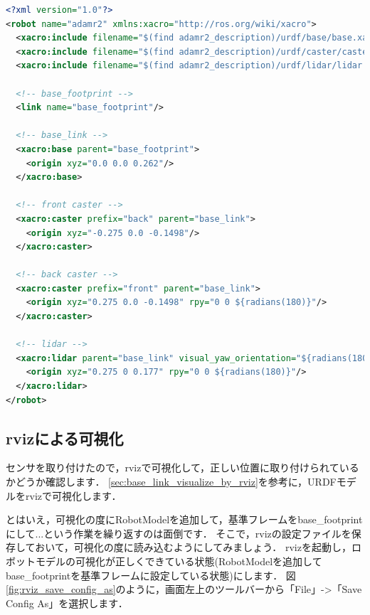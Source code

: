 \documentclass[{../../master}]{subfiles}
\begin{document}
\begin{lstlisting}[language=XML, label=code:robot_xacro_add_lidar_link, caption=Add \textsf{lidar\_link} to Robot Model]
<?xml version="1.0"?>
<robot name="adamr2" xmlns:xacro="http://ros.org/wiki/xacro">
  <xacro:include filename="$(find adamr2_description)/urdf/base/base.xacro"/>
  <xacro:include filename="$(find adamr2_description)/urdf/caster/caster.xacro"/>
  <xacro:include filename="$(find adamr2_description)/urdf/lidar/lidar.xacro"/>

  <!-- base_footprint -->
  <link name="base_footprint"/>

  <!-- base_link -->
  <xacro:base parent="base_footprint">
    <origin xyz="0.0 0.0 0.262"/>
  </xacro:base>

  <!-- front caster -->
  <xacro:caster prefix="back" parent="base_link">
    <origin xyz="-0.275 0.0 -0.1498"/>
  </xacro:caster>

  <!-- back caster -->
  <xacro:caster prefix="front" parent="base_link">
    <origin xyz="0.275 0.0 -0.1498" rpy="0 0 ${radians(180)}"/>
  </xacro:caster>

  <!-- lidar -->
  <xacro:lidar parent="base_link" visual_yaw_orientation="${radians(180)}">
    <origin xyz="0.275 0 0.177" rpy="0 0 ${radians(180)}"/>
  </xacro:lidar>
</robot>
\end{lstlisting}

\subsection{\textsf{rviz}による可視化}

センサを取り付けたので，\textsf{rviz}で可視化して，正しい位置に取り付けられているかどうか確認します．
\ref{sec:base_link_visualize_by_rviz}を参考に，URDFモデルを\textsf{rviz}で可視化します．

とはいえ，可視化の度に\textsf{RobotModel}を追加して，基準フレームを\textsf{base\_footprint}にして...という作業を繰り返すのは面倒です．
そこで，\textsf{rviz}の設定ファイルを保存しておいて，可視化の度に読み込むようにしてみましょう．
\textsf{rviz}を起動し，ロボットモデルの可視化が正しくできている状態(\textsf{RobotModel}を追加して\textsf{base\_footprint}を基準フレームに設定している状態)にします．
図\ref{fig:rviz_save_config_as}のように，画面左上のツールバーから「File」->「Save Config As」を選択します．
\end{document}
